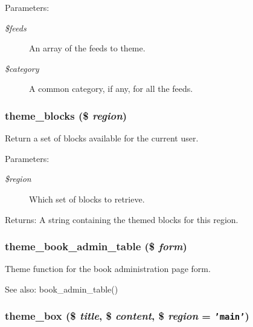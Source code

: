 \begin{Desc}
\item[Parameters:]
\begin{description}
\item[{\em \$feeds}]An array of the feeds to theme. \item[{\em \$category}]A common category, if any, for all the feeds. \end{description}
\end{Desc}
\hypertarget{group__themeable_g248f091cf3b4cb0d194933c052e44740}{
\subsubsection[{theme\_\-blocks}]{\setlength{\rightskip}{0pt plus 5cm}theme\_\-blocks (\$ {\em region})}}
\label{group__themeable_g248f091cf3b4cb0d194933c052e44740}


Return a set of blocks available for the current user.

\begin{Desc}
\item[Parameters:]
\begin{description}
\item[{\em \$region}]Which set of blocks to retrieve. \end{description}
\end{Desc}
\begin{Desc}
\item[Returns:]A string containing the themed blocks for this region. \end{Desc}
\hypertarget{group__themeable_g250393c4077bcc35d19c833dcdc999d4}{
\subsubsection[{theme\_\-book\_\-admin\_\-table}]{\setlength{\rightskip}{0pt plus 5cm}theme\_\-book\_\-admin\_\-table (\$ {\em form})}}
\label{group__themeable_g250393c4077bcc35d19c833dcdc999d4}


Theme function for the book administration page form.

\begin{Desc}
\item[See also:]book\_\-admin\_\-table() \end{Desc}
\hypertarget{group__themeable_ga2b9684385ee0e8c0e8a8947925047ba}{
\subsubsection[{theme\_\-box}]{\setlength{\rightskip}{0pt plus 5cm}theme\_\-box (\$ {\em title}, \/  \$ {\em content}, \/  \$ {\em region} = {\tt 'main'})}}
\label{group__themeable_ga2b9684385ee0e8c0e8a8947925047ba}


